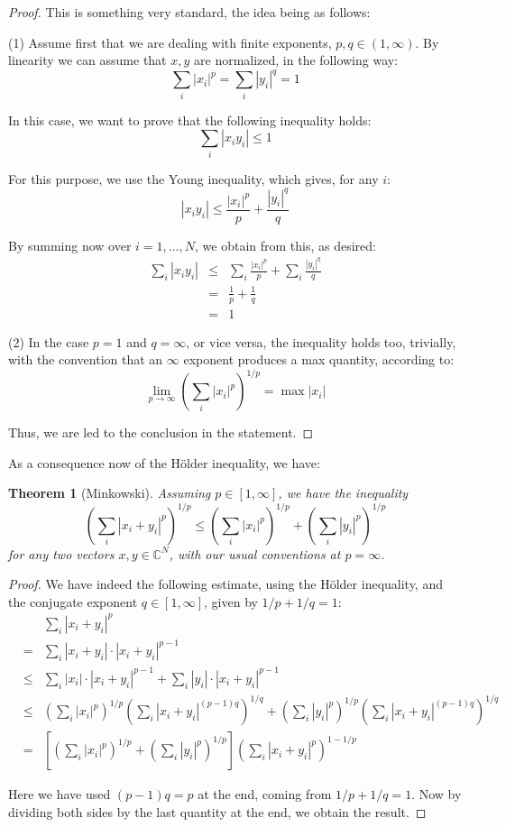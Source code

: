 \documentclass[12pt]{amsbook}
\newtheorem{theorem}{Theorem}[chapter]
\begin{document}
\begin{proof}
This is something very standard, the idea being as follows:

\medskip

(1) Assume first that we are dealing with finite exponents, $p,q\in(1,\infty)$. By linearity we can assume that $x,y$ are normalized, in the following way:
$$\sum_i|x_i|^p=\sum_i|y_i|^q=1$$

In this case, we want to prove that the following inequality holds:
$$\sum_i|x_iy_i|\leq1$$

For this purpose, we use the Young inequality, which gives, for any $i$:
$$|x_iy_i|\leq\frac{|x_i|^p}{p}+\frac{|y_i|^q}{q}$$

By summing now over $i=1,\ldots,N$, we obtain from this, as desired:
\begin{eqnarray*}
\sum_i|x_iy_i|
&\leq&\sum_i\frac{|x_i|^p}{p}+\sum_i\frac{|y_i|^q}{q}\\
&=&\frac{1}{p}+\frac{1}{q}\\
&=&1
\end{eqnarray*}

(2) In the case $p=1$ and $q=\infty$, or vice versa, the inequality holds too, trivially, with the convention that an $\infty$ exponent produces a max quantity, according to:
$$\lim_{p\to\infty}\left(\sum_i|x_i|^p\right)^{1/p}=\max|x_i|$$

Thus, we are led to the conclusion in the statement.
\end{proof}

As a consequence now of the H\"older inequality, we have:

\begin{theorem}[Minkowski]
Assuming $p\in[1,\infty]$, we have the inequality
$$\left(\sum_i|x_i+y_i|^p\right)^{1/p}\leq \left(\sum_i|x_i|^p\right)^{1/p}+\left(\sum_i|y_i|^p\right)^{1/p}$$
for any two vectors $x,y\in\mathbb C^N$, with our usual conventions at $p=\infty$.
\end{theorem}

\begin{proof}
We have indeed the following estimate, using the H\"older inequality, and the conjugate exponent $q\in[1,\infty]$, given by $1/p+1/q=1$:
\begin{eqnarray*}
&&\sum_i|x_i+y_i|^p\\
&=&\sum_i|x_i+y_i|\cdot|x_i+y_i|^{p-1}\\
&\leq&\sum_i|x_i|\cdot|x_i+y_i|^{p-1}+\sum_i|y_i|\cdot|x_i+y_i|^{p-1}\\
&\leq&\left(\sum_i|x_i|^p\right)^{1/p}\left(\sum_i|x_i+y_i|^{(p-1)q}\right)^{1/q}
+\left(\sum_i|y_i|^p\right)^{1/p}\left(\sum_i|x_i+y_i|^{(p-1)q}\right)^{1/q}\\
&=&\left[\left(\sum_i|x_i|^p\right)^{1/p}+\left(\sum_i|y_i|^p\right)^{1/p}\right]\left(\sum_i|x_i+y_i|^p\right)^{1-1/p}
\end{eqnarray*}

Here we have used $(p-1)q=p$ at the end, coming from $1/p+1/q=1$. Now by dividing both sides by the last quantity at the end, we obtain the result.
\end{proof}
\end{document}
